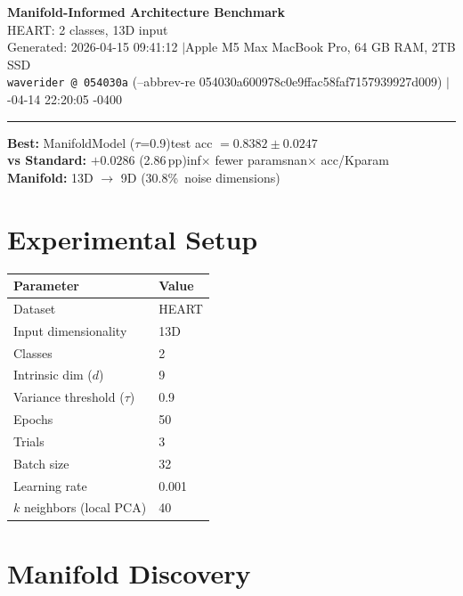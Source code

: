 \documentclass[11pt,letterpaper]{article}
\begin{document}
\begin{center}
  {\LARGE\bfseries\color{wavblue} Manifold-Informed Architecture Benchmark}\\[6pt]
  {\large HEART: 2 classes, 13D input}\\[8pt]
  {\small Generated: 2026-04-15 09:41:12 \quad$|$\quad Apple M5 Max MacBook Pro, 64 GB RAM, 2TB SSD}\\[2pt]
  {\small\texttt{waverider @ 054030a} (--abbrev-re
054030a600978c0e9ffac58faf7157939927d009) \quad$|$-04-14 22:20:05 -0400}
\end{center}
{\color{wavblue}\noindent\rule{\linewidth}{1.5pt}}
\medskip

\noindent\colorbox{wavlight}{\parbox{\dimexpr\linewidth-2\fboxsep\relax}{
  \smallskip
  \textbf{Best:} ManifoldModel ($\tau$=0.9)\quad test acc $= 0.8382 \pm 0.0247$\\[2pt]
  \textbf{vs Standard:} $+0.0286$ (2.86\,pp)\quad inf$\times$ fewer params\quad nan$\times$ acc/Kparam\\[2pt]
  \textbf{Manifold:} 13D $\rightarrow$ 9D (30.8\%\ noise dimensions)\\[2pt]
  \smallskip
}}
\bigskip

\section{Experimental Setup}

\begin{tabular}{@{}ll@{}}
\toprule
\textbf{Parameter} & \textbf{Value} \\
\midrule
  Dataset & HEART \\
  Input dimensionality & 13D \\
  Classes & 2 \\
  Intrinsic dim ($d$) & 9 \\
  Variance threshold ($\tau$) & 0.9 \\
  Epochs & 50 \\
  Trials & 3 \\
  Batch size & 32 \\
  Learning rate & 0.001 \\
  $k$ neighbors (local PCA) & 40 \\
\bottomrule
\end{tabular}

\section{Manifold Discovery}
\end{document}
